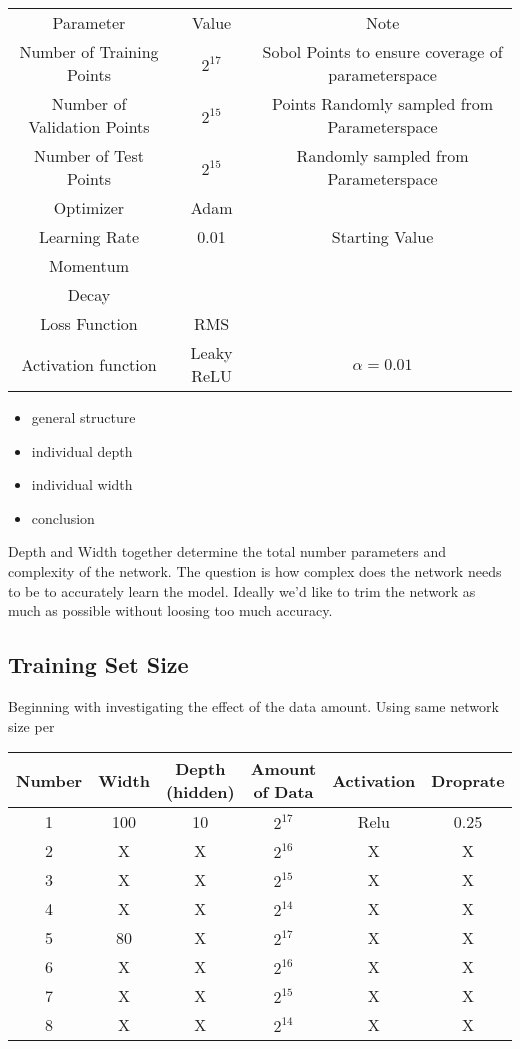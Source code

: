 			\begin{tabular}{c|c|c}
				Parameter & Value & Note\\
				Number of Training Points & $2^{17}$ & Sobol Points to ensure coverage of parameterspace\\
				Number of Validation Points & $2^{15}$ & Points Randomly sampled from Parameterspace \\
				Number of Test Points & $2^{15}$ & Randomly sampled from Parameterspace\\
				Optimizer & Adam & \\
				Learning Rate & 0.01 & Starting Value \\
				Momentum & & \\
				Decay & & \\
				Loss Function & RMS & \\
				Activation function & Leaky ReLU & $\alpha = 0.01$\\
				
				
			\end{tabular}
		\begin{itemize}
			\item general structure\\
			\item individual depth\\
			\item individual width\\
			\item conclusion
		\end{itemize}
		Depth and Width together determine the total number parameters and complexity of the network. The question is how complex does the network needs to be to accurately learn the model. Ideally we'd like to trim the network as much as possible without loosing too much accuracy.\\
		\subsection{Training Set Size}
			Beginning with investigating the effect of the data amount. Using same network size per 
			\begin{tabular}{c||c|c|c|c|c}
				Number & Width & Depth (hidden) & Amount of Data & Activation & Droprate \\
				\hline \hline
				1 & 100 & 10 & $2^17$ & Relu & 0.25\\
				2 & X & X & $2^16$ & X & X \\
				3 & X & X & $2^15$ & X & X \\
				4 & X & X & $2^14$ & X & X \\
				5 & 80 & X & $2^17$ & X & X \\
				6 & X & X & $2^16$ & X & X \\
				7 & X & X & $2^15$ & X & X \\
				8 & X & X & $2^14$ & X & X \\
			\end{tabular}
